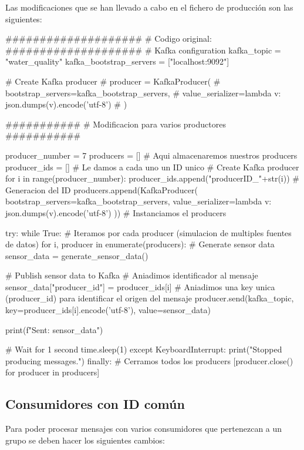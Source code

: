 \documentclass[
	a4paper, %
	12pt, %
]{CSSullivanBusinessReport}
\begin{document}
Las modificaciones que se han llevado a cabo en el fichero de producción son las siguientes:

\pagebreak

\begin{vscodePython}
####################
# Codigo original:
####################
# Kafka configuration
kafka_topic = "water_quality"
kafka_bootstrap_servers = ["localhost:9092"] 

# Create Kafka producer
# producer = KafkaProducer(
#     bootstrap_servers=kafka_bootstrap_servers,
#     value_serializer=lambda v: json.dumps(v).encode('utf-8')
# )

###########
# Modificacion para varios productores
###########

producer_number = 7
producers = [] # Aqui almacenaremos nuestros producers
producer_ids = [] # Le damos a cada uno un ID unico
# Create Kafka producer
for i in range(producer_number):
	producer_ids.append("producerID_"+str(i)) # Generacion del ID
	producers.append(KafkaProducer(
			bootstrap_servers=kafka_bootstrap_servers,
			value_serializer=lambda v: json.dumps(v).encode('utf-8')
			)) # Instanciamos el producers


try:
    while True:
        # Iteramos por cada producer (simulacion de multiples fuentes de datos)
        for i, producer  in enumerate(producers):
            # Generate sensor data
            sensor_data = generate_sensor_data()

            # Publish sensor data to Kafka
            # Aniadimos identificador al mensaje
            sensor_data["producer_id"] = producer_ids[i]
            # Aniadimos una key unica (producer_id) para identificar el origen del mensaje
            producer.send(kafka_topic, key=producer_ids[i].encode('utf-8'), value=sensor_data)

            print(f"Sent: {sensor_data}")

        # Wait for 1 second
        time.sleep(1)
except KeyboardInterrupt:
    print("Stopped producing messages.")
finally:
    # Cerramos todos los producers
    [producer.close() for producer in producers]
\end{vscodePython}

\subsection{Consumidores con ID común}
Para poder procesar mensajes con varios consumidores que pertenezcan a un grupo se deben hacer los siguientes cambios:
\end{document}
